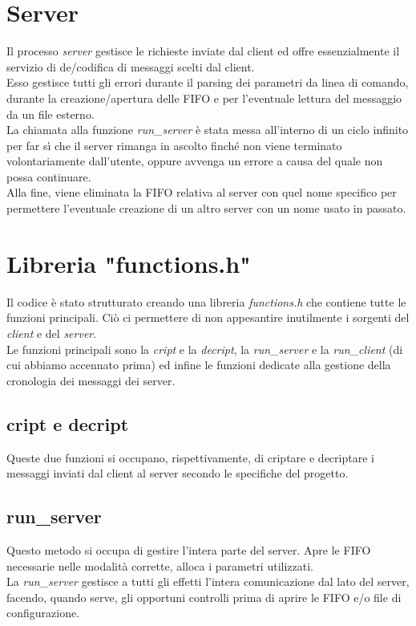 \documentclass[a4paper,9pt]{article}
\begin{document}
\section{Server}
Il processo \emph{server} gestisce le richieste inviate dal client ed offre essenzialmente il servizio di de/codifica di messaggi scelti dal client.\\
Esso gestisce tutti gli errori durante il parsing dei parametri da linea di comando, durante la creazione/apertura delle FIFO e per l'eventuale lettura del messaggio da un file esterno.\\
La chiamata alla funzione \emph{run\_server} è stata messa all'interno di un ciclo infinito per far sì che il server rimanga in ascolto finché non viene terminato volontariamente dall'utente, oppure avvenga un errore a causa del quale non possa continuare.\\
Alla fine, viene eliminata la FIFO relativa al server con quel nome specifico per permettere l'eventuale creazione di un altro server con un nome usato in passato.

\section{Libreria "functions.h"}
Il codice è stato strutturato creando una libreria \emph{functions.h} che contiene tutte le funzioni principali. Ciò ci permettere di non appesantire inutilmente i sorgenti del \emph{client} e del \emph{server}.\\
Le funzioni principali sono la \emph{cript} e la \emph{decript}, la \emph{run\_server} e la \emph{run\_client} (di cui abbiamo accennato prima) ed infine le funzioni dedicate alla gestione della cronologia dei messaggi dei server.
\subsection{cript e decript}
Queste due funzioni si occupano, rispettivamente, di criptare e decriptare i messaggi inviati dal client al server secondo le specifiche del progetto.
\subsection{run\_server}
Questo metodo si occupa di gestire l'intera parte del server. Apre le FIFO necessarie nelle modalità corrette, alloca i parametri utilizzati.\\ 
La \emph{run\_server} gestisce a tutti gli effetti l'intera comunicazione dal lato del server, facendo, quando serve, gli opportuni controlli prima di aprire le FIFO e/o file di configurazione.
\end{document}

